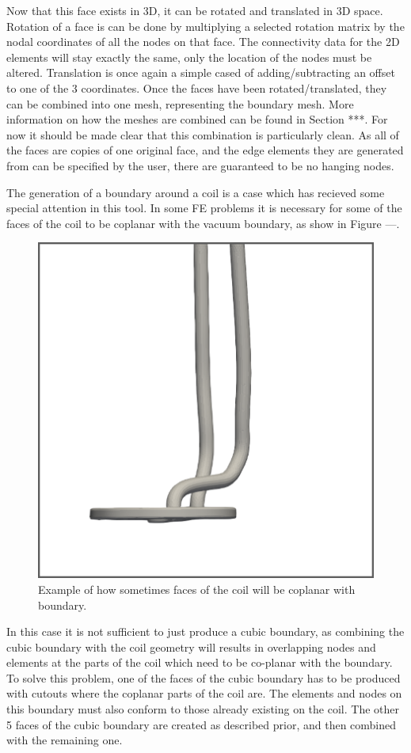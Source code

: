 \documentclass[12pt, letterpaper]{article}
\begin{document}
Now that this face exists in 3D, it can be rotated and translated in 3D space. Rotation of a face is can be done by multiplying a selected rotation matrix by the nodal coordinates of all the nodes on that face. The connectivity data for the 2D elements will stay exactly the same, only the location of the nodes must be altered. Translation is once again a simple cased of adding/subtracting an offset to one of the 3 coordinates. Once the faces have been rotated/translated, they can be combined into one mesh, representing the boundary mesh. More information on how the meshes are combined can be found in Section ***. For now it should be made clear that this combination is particularly clean. As all of the faces are copies of one original face, and the edge elements they are generated from can be specified by the user, there are guaranteed to be no hanging nodes.

The generation of a boundary around a coil is a case which has recieved some special attention in this tool. In some FE problems it is necessary for some of the faces of the coil to be coplanar with the vacuum boundary, as show in Figure ---. 

\begin{figure}
\begin{center}
\includegraphics[width=0.5\linewidth]{coplanarCoil.png}
\end{center}
\caption{Example of how sometimes faces of the coil will be coplanar with boundary.}
\label{coplanarCoilFig}
\end{figure}

In this case it is not sufficient to just produce a cubic boundary, as combining the cubic boundary with the coil geometry will results in overlapping nodes and elements at the parts of the coil which need to be co-planar with the boundary. To solve this problem, one of the faces of the cubic boundary has to be produced with cutouts where the coplanar parts of the coil are. The elements and nodes on this boundary must also conform to those already existing on the coil. The other 5 faces of the cubic boundary are created as described prior, and then combined with the remaining one.
\end{document}
